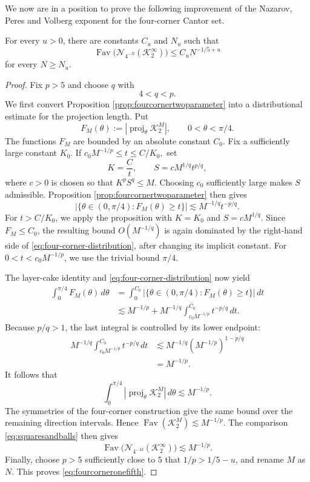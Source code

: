\documentclass[12pt]{amsart}
\numberwithin{equation}{section}
\DeclareMathOperator{\Fav}{Fav}
\DeclareMathOperator{\proj}{proj}
\begin{document}
We now are in a position to prove the following improvement of the Nazarov, Peres and Volberg exponent for the four-corner Cantor set.

\begin{theorem}\label{thm:fourcorneronefifth}
For every $u>0$, there are constants $C_u$ and $N_u$ such that
\begin{equation}\label{eq:fourcorneronefifth}
 \Fav\bigl(\mathcal N_{4^{-N}}(\mathcal K_2^\infty)\bigr)
 \leq C_uN^{-1/5+u}
\end{equation}
for every $N\geq N_u$.
\end{theorem}

\begin{proof}
Fix $p>5$ and choose $q$ with
\[
 4<q<p.
\]
We first convert Proposition \ref{prop:fourcornertwoparameter} into a
distributional estimate for the projection length.  Put
\[
 F_M(\theta):=|\proj_\theta\mathcal K_2^M|,
 \qquad 0<\theta<\pi/4.
\]
The functions $F_M$ are bounded by an absolute constant $C_0$.  Fix a
sufficiently large constant $K_0$.  If
$
 c_0M^{-1/p}\leq t\leq C/K_0,
$
set
\[
 K=\frac Ct,
 \qquad
 S=cM^{1/q}t^{p/q},
\]
where $c>0$ is chosen so that $K^pS^q\leq M$.  Choosing $c_0$ sufficiently
large makes $S$ admissible.  Proposition
\ref{prop:fourcornertwoparameter} then gives
\begin{equation}\label{eq:four-corner-distribution}
 |\{\theta\in(0,\pi/4):F_M(\theta)\geq t\}|
 \lesssim M^{-1/q}t^{-p/q}.
\end{equation}
For $t>C/K_0$, we apply the proposition with $K=K_0$ and
$S=cM^{1/q}$.  Since $F_M\leq C_0$, the resulting bound
$O(M^{-1/q})$ is again dominated by the right-hand side of
\eqref{eq:four-corner-distribution}, after changing its implicit constant.
For $0<t<c_0M^{-1/p}$, we use the trivial bound $\pi/4$.

The layer-cake identity and \eqref{eq:four-corner-distribution} now yield
\begin{align*}
 \int_0^{\pi/4}F_M(\theta)\,d\theta
 &=\int_0^{C_0}
 |\{\theta\in(0,\pi/4):F_M(\theta)\geq t\}|\,dt\\
 &\lesssim M^{-1/p}
 +M^{-1/q}\int_{c_0M^{-1/p}}^{C_0}t^{-p/q}\,dt.
\end{align*}
Because $p/q>1$, the last integral is controlled by its lower endpoint:
\begin{align*}
 M^{-1/q}\int_{c_0M^{-1/p}}^{C_0}t^{-p/q}\,dt
 &\lesssim
 M^{-1/q}(M^{-1/p})^{1-p/q}\\
 &=M^{-1/p}.
\end{align*}
It follows that
\[
 \int_0^{\pi/4}|\proj_\theta\mathcal K_2^M|\,d\theta
 \lesssim M^{-1/p}.
\]
The symmetries of the four-corner construction give the same bound over the
remaining direction intervals.  Hence $\Fav(\mathcal K_2^M)\lesssim
M^{-1/p}$.  The comparison \eqref{eq:squaresandballs} then gives
\[
 \Fav\bigl(\mathcal N_{4^{-M}}(\mathcal K_2^\infty)\bigr)
 \lesssim M^{-1/p}.
\]
Finally, choose $p>5$ sufficiently close to $5$ that
$1/p>1/5-u$, and rename $M$ as $N$.  This proves
\eqref{eq:fourcorneronefifth}.
\end{proof}
\end{document}
